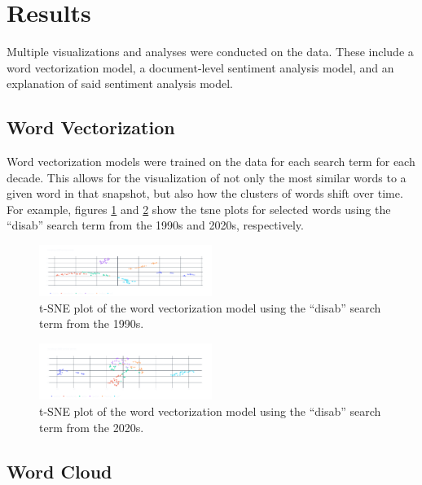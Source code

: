 \documentclass[11pt,a4paper, twocolumn]{article}
\begin{document}
\section{Results}
Multiple visualizations and analyses were conducted on the data. These include a word vectorization model, a document-level sentiment analysis model, and an explanation of said sentiment analysis model.

\subsection{Word Vectorization}

Word vectorization models were trained on the data for each search term for each decade. This allows for the visualization of not only the most similar words to a given word in that snapshot, but also how the clusters of words shift over time. For example, figures \ref{tsnea} and \ref{tsneb} show the tsne plots for selected words using the ``disab'' search term from the 1990s and 2020s, respectively.

\begin{figure}
  \centering
  \includegraphics[width=0.5\textwidth]{lemma_disab_1990_simword.png}
  \caption{\label{tsnea} t-SNE plot of the word vectorization model using the ``disab'' search term from the 1990s.}
  
\end{figure}
  
\begin{figure}
  \centering
  \includegraphics[width=0.5\textwidth]{lemma_disab_2020_simword.png}
  \caption{\label{tsneb} t-SNE plot of the word vectorization model using the ``disab'' search term from the 2020s.}
  
\end{figure}

\subsection{Word Cloud}
\end{document}
